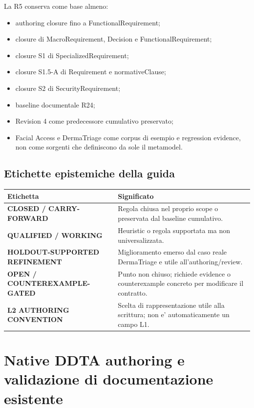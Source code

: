 \documentclass[11pt,a4paper]{article}
\begin{document}
La R5 conserva come base almeno:
\begin{itemize}
  \item authoring closure fino a FunctionalRequirement;
  \item closure di MacroRequirement, Decision e FunctionalRequirement;
  \item closure S1 di SpecializedRequirement;
  \item closure S1.5-A di Requirement e normativeClause;
  \item closure S2 di SecurityRequirement;
  \item baseline documentale R24;
  \item Revision 4 come predecessore cumulativo preservato;
  \item Facial Access e DermaTriage come corpus di esempio e regression evidence, non come sorgenti che definiscono da sole il metamodel.
\end{itemize}

\subsection{Etichette epistemiche della guida}

\begin{tabularx}{\textwidth}{L{52mm}Y}
\toprule
\textbf{Etichetta} & \textbf{Significato} \\
\midrule
{\sffamily\bfseries\color{DDTAGreen}CLOSED / CARRY-FORWARD} & Regola chiusa nel proprio scope o preservata dal baseline cumulativo. \\
{\sffamily\bfseries\color{DDTAAmber}QUALIFIED / WORKING} & Heuristic o regola supportata ma non universalizzata. \\
{\sffamily\bfseries\color{DDTATeal}HOLDOUT-SUPPORTED REFINEMENT} & Miglioramento emerso dal caso reale DermaTriage e utile all'authoring/review. \\
{\sffamily\bfseries\color{DDTARed}OPEN / COUNTEREXAMPLE-GATED} & Punto non chiuso; richiede evidence o counterexample concreto per modificare il contratto. \\
{\sffamily\bfseries\color{DDTABlue}L2 AUTHORING CONVENTION} & Scelta di rappresentazione utile alla scrittura; non e' automaticamente un campo L1. \\
\bottomrule
\end{tabularx}

\section{Native DDTA authoring e validazione di documentazione esistente}
\end{document}
